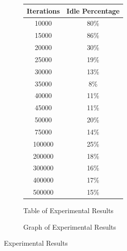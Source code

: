 \documentclass{article}
\begin{document}
\begin{figure}
    \centering
    \begin{subfigure}[b]{0.4\textwidth}
        \begin{tabular}{cc}
            \toprule
            Iterations & Idle Percentage \\
            \midrule
            10000      & 80\%            \\
            15000      & 86\%            \\
            20000      & 30\%            \\
            25000      & 19\%            \\
            30000      & 13\%            \\
            35000      & 8\%             \\
            40000      & 11\%            \\
            45000      & 11\%            \\
            50000      & 20\%            \\
            75000      & 14\%            \\
            100000     & 25\%            \\
            200000     & 18\%            \\
            300000     & 16\%            \\
            400000     & 17\%            \\
            500000     & 15\%            \\
            \bottomrule
        \end{tabular}
        \caption{Table of Experimental Results}
        \label{tab:tabl}
    \end{subfigure}
    \begin{subfigure}[b]{0.4\textwidth}
        \caption{Graph of Experimental Results}
        \label{graph:grap}
    \end{subfigure}
    \caption{Experimental Results}
\end{figure}
\end{document}

